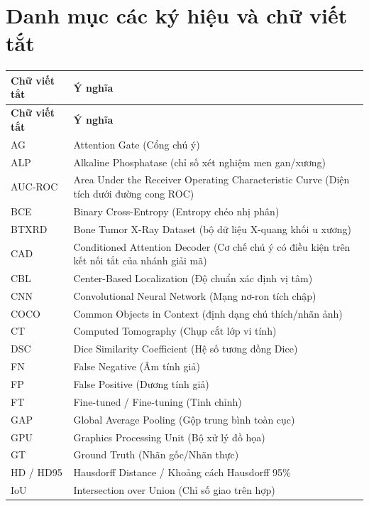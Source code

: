 \chapter*{Danh mục các ký hiệu và chữ viết tắt}
\label{danhmuctuvietat}

\begin{longtable}{|>{\raggedright\arraybackslash}p{3.2cm}|p{10.8cm}|}
\hline
\textbf{Chữ viết tắt} & \textbf{Ý nghĩa} \\
\hline
\endfirsthead
\hline
\textbf{Chữ viết tắt} & \textbf{Ý nghĩa} \\
\hline
\endhead
AG & Attention Gate (Cổng chú ý) \\ \hline
ALP & Alkaline Phosphatase (chỉ số xét nghiệm men gan/xương) \\ \hline
AUC-ROC & Area Under the Receiver Operating Characteristic Curve (Diện tích dưới đường cong ROC) \\ \hline
BCE & Binary Cross-Entropy (Entropy chéo nhị phân) \\ \hline
BTXRD & Bone Tumor X-Ray Dataset (bộ dữ liệu X-quang khối u xương) \\ \hline
CAD & Conditioned Attention Decoder (Cơ chế chú ý có điều kiện trên kết nối tắt của nhánh giải mã) \\ \hline
CBL & Center-Based Localization (Độ chuẩn xác định vị tâm) \\ \hline
CNN & Convolutional Neural Network (Mạng nơ-ron tích chập) \\ \hline
COCO & Common Objects in Context (định dạng chú thích/nhãn ảnh) \\ \hline
CT & Computed Tomography (Chụp cắt lớp vi tính) \\ \hline
DSC & Dice Similarity Coefficient (Hệ số tương đồng Dice) \\ \hline
FN & False Negative (Âm tính giả) \\ \hline
FP & False Positive (Dương tính giả) \\ \hline
FT & Fine-tuned / Fine-tuning (Tinh chỉnh) \\ \hline
GAP & Global Average Pooling (Gộp trung bình toàn cục) \\ \hline
GPU & Graphics Processing Unit (Bộ xử lý đồ họa) \\ \hline
GT & Ground Truth (Nhãn gốc/Nhãn thực) \\ \hline
HD / HD95 & Hausdorff Distance / Khoảng cách Hausdorff 95\% \\ \hline
IoU & Intersection over Union (Chỉ số giao trên hợp) \\ \hline

\end{longtable}
